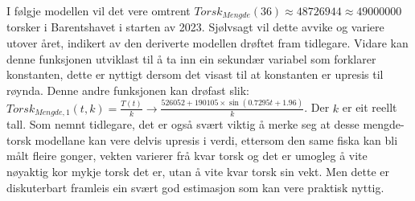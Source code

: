 \documentclass{report}
\begin{document}
I følgje modellen vil det vere omtrent $Torsk_{Mengde}(36)\approx 48726944 \approx 49000000$ torsker i Barentshavet i starten av 2023. Sjølvsagt vil dette avvike og variere utover året, indikert av den deriverte modellen drøftet fram tidlegare.
Vidare kan denne funksjonen utviklast til å ta inn ein sekundær variabel som forklarer konstanten, dette er nyttigt dersom det visast til at konstanten er upresis til røynda.
Denne andre funksjonen kan drøfast slik: $Torsk_{Mengde,1}(t,k)=\frac{T(t)}{k}\rightarrow \frac{526052+190105\times \sin(0.7295t+1.96)}{k}$. Der $k$ er eit reellt tall.
Som nemnt tidlegare, det er også svært viktig å merke seg at desse mengde-torsk modellane kan vere delvis upresis i verdi, ettersom den same fiska kan bli målt fleire gonger, vekten varierer frå kvar torsk og det er umogleg å vite nøyaktig kor mykje torsk det er, utan å vite kvar torsk sin vekt.
Men dette er diskuterbart framleis ein svært god estimasjon som kan vere praktisk nyttig.
\end{document}
